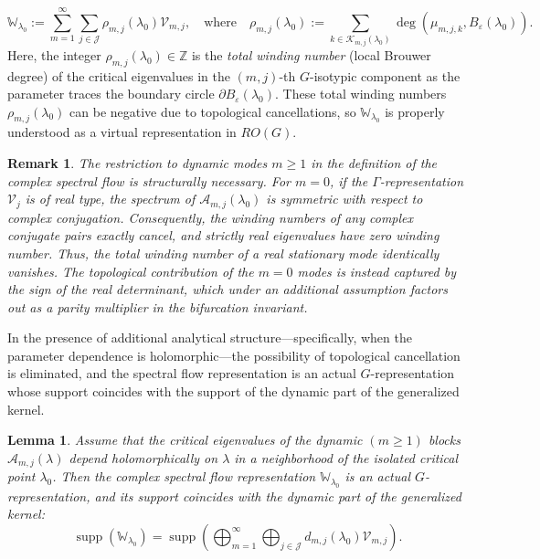 \documentclass[twoside,11pt]{article}
\def\bz{{\mathbb{Z}}}
\newtheorem{lemma}[theorem]{Lemma}
\newtheorem{remark}[theorem]{Remark}
\begin{document}
\begin{equation} \label{def:spectral_flow_rep}
\mathbb{W}_{\lambda_0} := \sum_{m=1}^\infty\sum_{j \in \mathcal J} \rho_{m,j}(\lambda_0) \mathcal{V}_{m,j}, \quad \text{where} \quad \rho_{m,j}(\lambda_0) := \sum_{k \in \mathcal K_{m,j}(\lambda_0)} \deg(\mu_{m,j,k}, B_\varepsilon(\lambda_0)).
\end{equation}
Here, the integer $\rho_{m,j}(\lambda_0) \in \bz$ is the \emph{total winding number} (local Brouwer degree) of the critical eigenvalues in the $(m,j)$-th $G$-isotypic component as the parameter traces the boundary circle $\partial B_\varepsilon(\lambda_0)$. These total winding numbers $\rho_{m,j}(\lambda_0)$ can be negative due to topological cancellations, so $\mathbb{W}_{\lambda_0}$ is properly understood as a virtual representation in $RO(G)$. 
\begin{remark}
The restriction to dynamic modes $m \geq 1$ in the definition of the complex spectral flow is structurally necessary. For $m=0$, if the $\Gamma$-representation $\mathcal V_j$
is of real type, the spectrum of $\mathscr A_{m,j}(\lambda_0)$ is symmetric with respect to complex conjugation. Consequently, the winding numbers of any complex conjugate pairs exactly cancel, and strictly real eigenvalues have zero winding number. Thus, the total winding number of a real stationary mode identically vanishes. The topological contribution of the $m=0$ modes is instead captured by the sign of the real determinant, which under an additional assumption factors out as a parity multiplier in the bifurcation invariant.
\end{remark}
In the presence of additional analytical structure---specifically, when the parameter dependence is holomorphic---the possibility of topological cancellation is eliminated, and the spectral flow representation is an actual $G$-representation whose support coincides with the support of the dynamic part of the generalized kernel.
\begin{lemma}\label{lem:holomorphic_kernel}
Assume that the critical eigenvalues of the dynamic $(m \geq 1)$ blocks
$\mathscr A_{m,j}(\lambda)$ depend holomorphically on $\lambda$ in a
neighborhood of the isolated critical point $\lambda_0$. Then the complex
spectral flow representation $\mathbb W_{\lambda_0}$ is an actual
$G$-representation, and its support coincides with the dynamic part of the
generalized kernel:
\[
\operatorname{supp}(\mathbb W_{\lambda_0})
=
\operatorname{supp}\left(
\bigoplus_{m=1}^{\infty}
\bigoplus_{j\in\mathcal J}
d_{m,j}(\lambda_0)\mathcal V_{m,j}
\right).
\]
\end{lemma}
\end{document}

